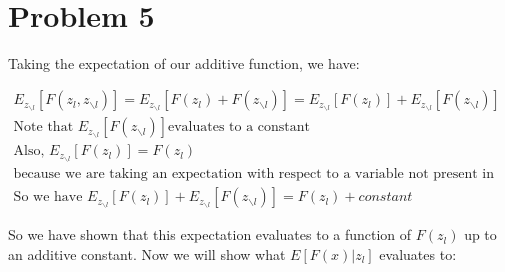 \documentclass[11pt]{article}
\begin{document}
\begin{center}

\ \\
\end{center}


\section*{Problem 5}

\vspace{1 mm}
\noindent
Taking the expectation of our additive function, we have:

\begin{gather*}
E_{z_{\backslash l}}[F(z_{l}, z_{\backslash l})] = 
E_{z_{\backslash l}}[F(z_{l}) + F(z_{\backslash l})] = 
E_{z_{\backslash l}}[F(z_{l})] + E_{z_{\backslash l}}[F(z_{\backslash l})]\\
\text{Note that } E_{z_{\backslash l}}[F(z_{\backslash l})] 
\text{evaluates to a constant}\\
\text{Also, } E_{z_{\backslash l}}[F(z_{l})] = F(z_{l})\\
\text{because we are taking an expectation with respect to a variable not present in the function}\\
\text{So we have } 
E_{z_{\backslash l}}[F(z_{l})] + E_{z_{\backslash l}}[F(z_{\backslash l})] = 
F(z_{l}) + constant
\end{gather*}

\vspace{5 mm}
\noindent
So we have shown that this expectation evaluates to a function of $F(z_{l})$ 
up to an additive constant. Now we will show what $E[F(x)|z_{l}]$ evaluates to:
\end{document}
